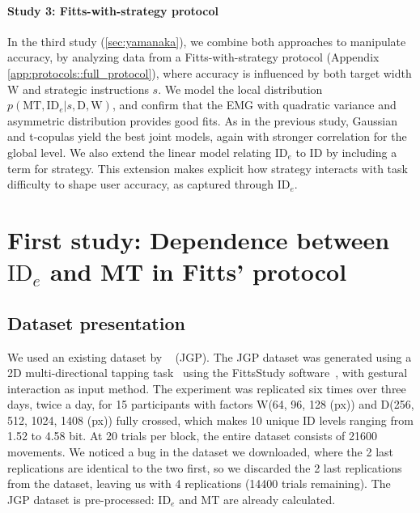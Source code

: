 \documentclass[acmlarge, manuscript,review]{acmart}
\newcommand{\mt}{\ensuremath{{\text{MT}}}\xspace}
\newcommand{\ide}{\ensuremath{{\text{ID}_e}}\xspace}
\newcommand{\D}{\ensuremath{{\text{D}}}\xspace}
\newcommand{\W}{\ensuremath{{\text{W}}}\xspace}
\begin{document}
\paragraph*{Study 3: Fitts-with-strategy protocol}
In the third study (\autoref{sec:yamanaka}), we combine both approaches to manipulate accuracy, by analyzing data from a Fitts-with-strategy protocol (Appendix \ref{app:protocols::full_protocol}), where accuracy is influenced by both target width \W and strategic instructions $s$.
We model the local distribution $p(\mt, \ide | s, \D, \W)$, and confirm that the EMG with quadratic variance and asymmetric distribution provides good fits.
As in the previous study, Gaussian and t-copulas yield the best joint models, again with stronger correlation for the global level.
We also extend the linear model relating \ide to ID by including a term for strategy. This extension makes explicit how strategy interacts with task difficulty to shape user accuracy, as captured through \ide.

\section{First study: Dependence between \ide and MT in Fitts' protocol\label{sec:jgp}}

\subsection{Dataset presentation}
We used an existing dataset by \citeauthor{jude2016}~\cite{jude2016} (JGP). The JGP dataset was generated using a 2D multi-directional tapping task~\cite{soukoreff2004} using the FittsStudy software~\cite{wobbrock2011}, with gestural interaction as input method. The experiment was replicated six times over three days, twice a day, for 15 participants with factors \W (64, 96, 128 (px)) and \D (256, 512, 1024, 1408 (px)) fully crossed, which makes 10 unique ID levels ranging from 1.52 to 4.58 bit. At 20 trials per block, the entire dataset consists of 21600 movements.
We noticed a bug in the dataset we downloaded, where the 2 last replications are identical to the two first, so we discarded the 2 last replications from the dataset, leaving us with 4 replications (14400 trials remaining). The JGP dataset is pre-processed: \ide and MT are already calculated.
\end{document}
